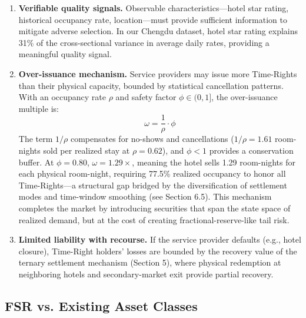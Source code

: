 \documentclass[12pt,a4paper]{article}
\begin{document}
\begin{enumerate}[nosep]
    \item \textbf{Verifiable quality signals.} Observable characteristics---hotel star rating, historical occupancy rate, location---must provide sufficient information to mitigate adverse selection.
    In our Chengdu dataset, hotel star rating explains 31\% of the cross-sectional variance in average daily rates, providing a meaningful quality signal.

    \item \textbf{Over-issuance mechanism.} Service providers may issue more Time-Rights than their physical capacity, bounded by statistical cancellation patterns.
    With an occupancy rate $\rho$ and safety factor $\phi \in (0,1]$, the over-issuance multiple is:
    \begin{equation}
        \omega = \frac{1}{\rho} \cdot \phi
    \end{equation}
    The term $1/\rho$ compensates for no-shows and cancellations ($1/\rho = 1.61$ room-nights sold per realized stay at $\rho = 0.62$), and $\phi < 1$ provides a conservation buffer.
    At $\phi = 0.80$, $\omega = 1.29\times$, meaning the hotel sells 1.29 room-nights for each physical room-night, requiring 77.5\% realized occupancy to honor all Time-Rights---a structural gap bridged by the diversification of settlement modes and time-window smoothing (see Section 6.5).
    This mechanism completes the market by introducing securities that span the state space of realized demand, but at the cost of creating fractional-reserve-like tail risk.

    \item \textbf{Limited liability with recourse.} If the service provider defaults (e.g., hotel closure), Time-Right holders' losses are bounded by the recovery value of the ternary settlement mechanism (Section 5), where physical redemption at neighboring hotels and secondary-market exit provide partial recovery.
\end{enumerate}

\subsection{FSR vs. Existing Asset Classes}
\end{document}
